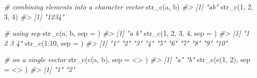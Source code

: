 \documentclass[
]{book}
\newenvironment{Shaded}{\begin{snugshade}}{\end{snugshade}}
\newcommand{\AttributeTok}[1]{\textcolor[rgb]{0.77,0.63,0.00}{#1}}
\newcommand{\CommentTok}[1]{\textcolor[rgb]{0.56,0.35,0.01}{\textit{#1}}}
\newcommand{\DecValTok}[1]{\textcolor[rgb]{0.00,0.00,0.81}{#1}}
\newcommand{\FunctionTok}[1]{\textcolor[rgb]{0.00,0.00,0.00}{#1}}
\newcommand{\NormalTok}[1]{#1}
\newcommand{\SpecialCharTok}[1]{\textcolor[rgb]{0.00,0.00,0.00}{#1}}
\newcommand{\StringTok}[1]{\textcolor[rgb]{0.31,0.60,0.02}{#1}}
\begin{document}
\begin{Shaded}
\begin{Highlighting}[]
\CommentTok{\# combining elements into a character vector}
\FunctionTok{str\_c}\NormalTok{(}\StringTok{\textquotesingle{}a\textquotesingle{}}\NormalTok{, }\StringTok{\textquotesingle{}b\textquotesingle{}}\NormalTok{)}
\CommentTok{\#\textgreater{} [1] "ab"}
\FunctionTok{str\_c}\NormalTok{(}\DecValTok{1}\NormalTok{, }\DecValTok{2}\NormalTok{, }\DecValTok{3}\NormalTok{, }\DecValTok{4}\NormalTok{)}
\CommentTok{\#\textgreater{} [1] "1234"}

\CommentTok{\# using sep}
\FunctionTok{str\_c}\NormalTok{(}\StringTok{\textquotesingle{}a\textquotesingle{}}\NormalTok{, }\StringTok{\textquotesingle{}b\textquotesingle{}}\NormalTok{, }\AttributeTok{sep =} \StringTok{\textquotesingle{} \textquotesingle{}}\NormalTok{)}
\CommentTok{\#\textgreater{} [1] "a b"}
\FunctionTok{str\_c}\NormalTok{(}\DecValTok{1}\NormalTok{, }\DecValTok{2}\NormalTok{, }\DecValTok{3}\NormalTok{, }\DecValTok{4}\NormalTok{, }\AttributeTok{sep =} \StringTok{\textquotesingle{} \textquotesingle{}}\NormalTok{)}
\CommentTok{\#\textgreater{} [1] "1 2 3 4"}
\FunctionTok{str\_c}\NormalTok{(}\DecValTok{1}\SpecialCharTok{:}\DecValTok{10}\NormalTok{, }\AttributeTok{sep =} \StringTok{\textquotesingle{} \textquotesingle{}}\NormalTok{)}
\CommentTok{\#\textgreater{}  [1] "1"  "2"  "3"  "4"  "5"  "6"  "7"  "8"  "9"  "10"}

\CommentTok{\# on a single vector}
\FunctionTok{str\_c}\NormalTok{(}\FunctionTok{c}\NormalTok{(}\StringTok{\textquotesingle{}a\textquotesingle{}}\NormalTok{, }\StringTok{\textquotesingle{}b\textquotesingle{}}\NormalTok{), }\AttributeTok{sep =} \StringTok{\textquotesingle{} \textless{}\textgreater{} \textquotesingle{}}\NormalTok{)}
\CommentTok{\#\textgreater{} [1] "a" "b"}
\FunctionTok{str\_c}\NormalTok{(}\FunctionTok{c}\NormalTok{(}\DecValTok{1}\NormalTok{, }\DecValTok{2}\NormalTok{), }\AttributeTok{sep =} \StringTok{\textquotesingle{} \textless{}\textgreater{} \textquotesingle{}}\NormalTok{)}
\CommentTok{\#\textgreater{} [1] "1" "2"}


\end{Highlighting}
\end{Shaded}
\end{document}
